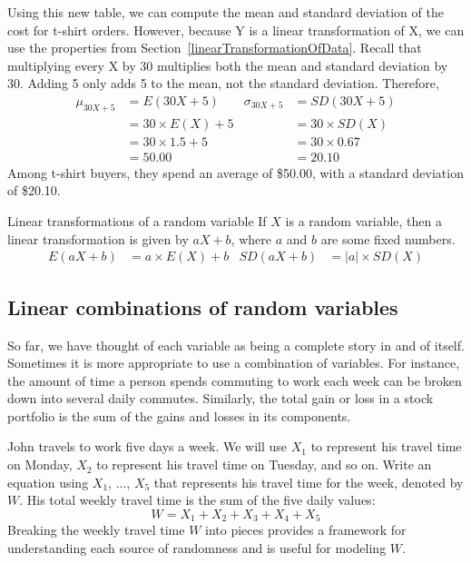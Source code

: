 \D{\newpage}

Using this new table, we can compute the mean and standard deviation of the cost for t-shirt orders. However, because Y is a linear transformation of X, we can use the properties from Section~\ref{linearTransformationOfData}. Recall that multiplying every X by 30 multiplies both the mean and standard deviation by 30. Adding 5 only adds 5 to the mean, not the standard deviation. Therefore,
\begin{align*}
\mu_{30X+5}&=E(30X+5) 
	& \sigma_{30X+5}&=SD(30X+5)\\
&= 30\times E(X) + 5
	& &= 30\times SD(X) \\
&= 30\times 1.5+5
	& &= 30 \times 0.67 \\
&= 50.00 
	& &= 20.10
\end{align*}
Among t-shirt buyers, they spend an average of \$50.00, with a standard deviation of \$20.10.

\begin{onebox}{Linear transformations of a random variable}
If $X$ is a random variable, then a linear transformation is given by $aX + b$, where $a$ and $b$ are some fixed numbers.
\begin{align*}
E(aX+b) &= a\times E(X) + b
&
SD(aX+b) &= \lvert a\rvert \times SD(X)
\end{align*}
\end{onebox}

\subsection{Linear combinations of random variables}

So far, we have thought of each variable as being a complete story in and of itself. Sometimes it is more appropriate to use a combination of variables. For instance, the amount of time a person spends commuting to work each week can be broken down into several daily commutes. Similarly, the total gain or loss in a stock portfolio is the sum of the gains and losses in its components.

\begin{examplewrap}
\begin{nexample}{John travels to work five days a week. We will use $X_1$ to represent his travel time on Monday, $X_2$ to represent his travel time on Tuesday, and so on. Write an equation using $X_1$, ..., $X_5$ that represents his travel time for the week, denoted by $W$.}
His total weekly travel time is the sum of the five daily values:
$$ W = X_1 + X_2 + X_3 + X_4 + X_5 $$
Breaking the weekly travel time $W$ into pieces provides a framework for understanding each source of randomness and is useful for modeling $W$.
\end{nexample}
\end{examplewrap}

